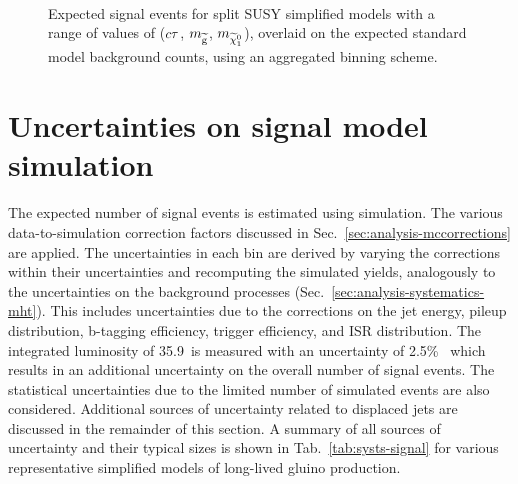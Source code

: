 \begin{figure}[!ht]
~~
\\
\caption{Expected signal events for split SUSY simplified models with a range 
of values of ($c\tau$, $m_{\mathrm{\widetilde{g}}}$, $m_{\widetilde{\chi}_1^0}$), overlaid on the expected standard 
model background counts, using an aggregated binning scheme.}
\label{fig:T1qqqqLL_MR}
\end{figure}


\section{Uncertainties on signal model simulation}
The expected number of signal events is estimated using simulation. The various 
data-to-simulation correction factors discussed in 
Sec.~\ref{sec:analysis-mccorrections} are applied. The uncertainties in each 
\njnbhtmht bin are derived by varying the corrections within their 
uncertainties and recomputing the simulated yields, analogously to the 
uncertainties on the background processes 
(Sec.~\ref{sec:analysis-systematics-mht}). 
This includes uncertainties due to the corrections on the jet energy, pileup 
distribution, b-tagging efficiency, trigger efficiency, and ISR distribution. 
The integrated luminosity of 35.9~\ifb is measured with an uncertainty of 
2.5\%~\cite{lumi2016} which results in an additional uncertainty on the overall 
number of signal events. The statistical uncertainties due to the limited 
number of simulated events are also considered. Additional sources of 
uncertainty related to displaced jets are discussed in the remainder of this 
section. A summary of all sources of uncertainty and their typical sizes is 
shown in Tab.~\ref{tab:systs-signal} for various representative simplified 
models of long-lived gluino production.

